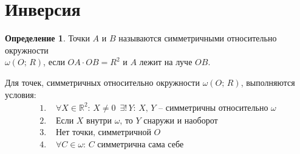 \documentclass[12pt]{article}
\theoremstyle{definition}
\newtheorem{definition}{Определение}
\newcommand{\R}{\mathbb{R}}
\begin{document}
    \section{Инверсия}
    \begin{definition}
        Точки $A$ и $B$ называются симметричными относительно окружности\\ $\omega(O;\,R)$, если $OA\cdot OB=R^2$ и $A$ лежит на луче $OB$.\bigskip

        Для точек, симметричных относительно окружности $\omega(O;\,R)$, выполняются условия:
        \begin{align*}
            1.\,\,&\forall X\in \R^2:\,X\neq0\,\,\,\exists!\,Y:\,X,\,Y \text{ -- симметричны относительно } \omega\\
            2.\,\,&\text{Если } X \text{ внутри } \omega\text{, то } Y \text{ снаружи и наоборот}\\
            3.\,\,&\text{Нет точки, симметричной } O\\
            4.\,\,&\forall C \in \omega:\,C \text{ симметрична сама себе}
        \end{align*}
    \end{definition}
\end{document}
